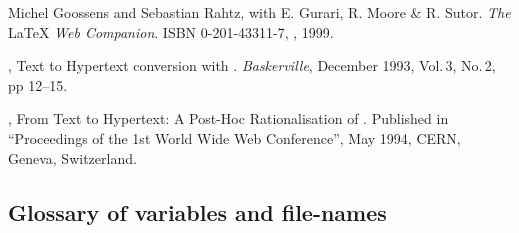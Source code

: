 \documentclass[a4paper]{article}
\begin{document}
\begin{thebibliography}{1}
%
%
%
\begin{htmlonly}
%
%
%
\end{htmlonly}
Michel Goossens and Sebastian Rahtz, with E. Gurari, R. Moore \& R. Sutor.
\newblock \emph{The }\LaTeX\emph{ Web Companion}.
\newblock ISBN 0-201-43311-7, \AddWes, 1999.

\NikosDrakos,
\newblock Text to Hypertext conversion with \latextohtml.
\newblock \textit{Baskerville}, December 1993, Vol.\,3, No.\,2, pp 12--15.

\NikosDrakos,
\newblock From Text to Hypertext: A Post-Hoc Rationalisation of \latextohtml.
\newblock Published in ``Proceedings of the 1st World Wide Web Conference'',
\newblock May 1994, CERN, Geneva, Switzerland.

\end{thebibliography}


%
%
%
%       
\begin{latexonly}
%
{}
\end{latexonly}

\begin{htmlonly}
\section{Glossary of variables and file-names\label{Glossary}}
\begin{htmllist}

\end{htmllist}
\end{htmlonly}
\end{document}
